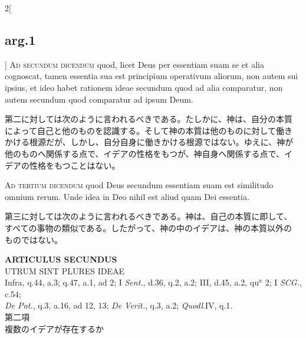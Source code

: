 \documentclass[paper=a4paper,fontsize=10pt,jafontsize=9pt,titlepage]{jlreq}
\begin{document}
\begin{paracol}{2}[\subsection{arg.1}]
{\scshape Ad secundum dicendum} quod, licet Deus per essentiam suam se
et alia cognoscat, tamen essentia sua est principium operativum
aliorum, non autem sui ipsius, et ideo habet rationem ideae secundum
quod ad alia comparatur, non autem secundum quod comparatur ad ipsum
Deum.

\switchcolumn

第二に対しては次のように言われるべきである。たしかに、神は、自分の本質
によって自己と他のものを認識する。そして神の本質は他のものに対して働き
かける根源だが、しかし、自分自身に働きかける根源ではない。ゆえに、神が
他のものへ関係する点で、イデアの性格をもつが、神自身へ関係する点で、イ
デアの性格をもつことはない。

\switchcolumn*[\subsection{ad.3}]

{\scshape Ad tertium dicendum} quod Deus secundum essentiam suam est
similitudo omnium rerum. Unde idea in Deo nihil est aliud quam Dei
essentia.

\switchcolumn

第三に対しては次のように言われるべきである。神は、自己の本質に即して、
すべての事物の類似である。したがって、神の中のイデアは、神の本質以外の
ものではない。

\end{paracol}
\newpage


\begin{center}
 {\Large {\bfseries ARTICULUS SECUNDUS}}\\
 {\large UTRUM SINT PLURES IDEAE}\\
 {\footnotesize Infra, q.44, a.3; q.47, a.1, ad 2; I {\itshape
 Sent.}, d.36, q.2, a.2; III, d.45, a.2, qu$^a$ 2; I {\itshape
 SCG.}, c.54; \\{\itshape De Pot.}, q.3, a.16, ad 12, 13; {\itshape De
 Verit.}, q.3, a.2; {\itshape Quodl}.IV, q.1.}\\
 {\Large 第二項\\複数のイデアが存在するか}
\end{center}

{}
\setcounter{section}{2}
\setcounter{subsection}{0}
\end{document}
